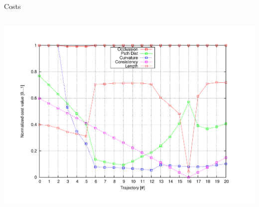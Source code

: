 \begin{frame}[plain]{Costs}
\begin{columns}
\begin{center}
      \includegraphics[width=\textwidth,trim=50 40 80 60,clip]{costs17}
    \end{center}
  \end{columns}
\end{frame}

